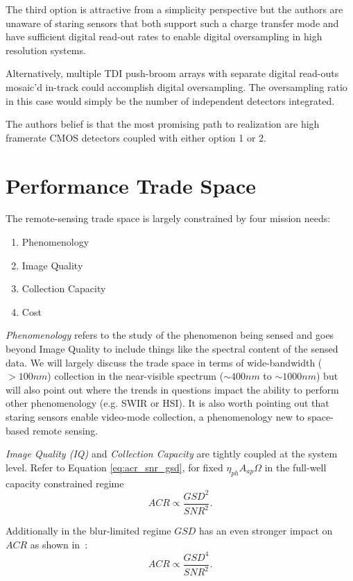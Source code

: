 \documentclass[10pt,journal]{IEEEtran}  %
\begin{document}
The third option is attractive from a simplicity perspective but the authors are unaware of staring sensors that both support such a charge transfer mode and have sufficient digital read-out rates to enable digital oversampling in high resolution systems.

Alternatively, multiple TDI push-broom arrays with separate digital read-outs mosaic'd in-track could accomplish digital oversampling.  The oversampling ratio in this case would simply be the number of independent detectors integrated.

The authors belief is that the most promising path to realization are high framerate CMOS detectors coupled with either option 1 or 2.

\section{Performance Trade Space}
\label{sec:trade_space}

The remote-sensing trade space is largely constrained by four mission needs:

\begin{enumerate}
\item Phenomenology
\item Image Quality
\item Collection Capacity
\item Cost
\end{enumerate}

\emph{Phenomenology} refers to the study of the phenomenon being sensed and goes beyond Image Quality to include things like the spectral content of the sensed data.  We will largely discuss the trade space in terms of wide-bandwidth ($>100 nm$) collection in the near-visible spectrum ($\sim 400 nm$ to $\sim 1000 nm$) but will also point out where the trends in questions impact the ability to perform other phenomenology (e.g. SWIR or HSI).  It is also worth pointing out that staring sensors enable video-mode collection, a phenomenology new to space-based remote sensing.

\emph{Image Quality (IQ)} and \emph{Collection Capacity} are tightly coupled at the system level.  Refer to Equation \eqref{eq:acr_snr_gsd}, for fixed $\eta_{ph} A_{ap} \Omega$ in the full-well capacity constrained regime
\begin{equation}
    \label{eq:acr_scaling}
    ACR \propto \frac{GSD^2}{SNR^2}.
\end{equation}

Additionally in the blur-limited regime $GSD$ has an even stronger impact on $ACR$ as shown in~\cite{shaw}:
\begin{equation}
\label{eq:acr_scaling_blur_limited}
    ACR \propto \frac{GSD^4}{SNR^2}.
\end{equation}
\end{document}
